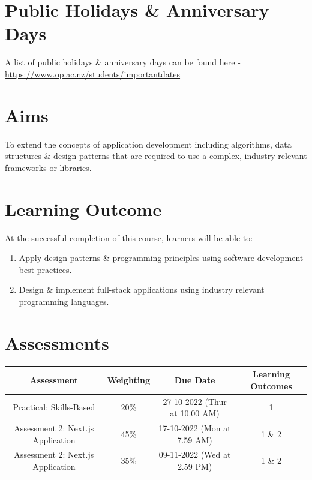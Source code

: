 \documentclass{article}
\begin{document}
\section*{Public Holidays \& Anniversary Days}
A list of public holidays \& anniversary days can be found here - \href{https://www.op.ac.nz/students/importantdates}{https://www.op.ac.nz/students/importantdates}

\section*{Aims}
To extend the concepts of application development including algorithms, data structures \& design patterns that are required to use a complex, industry-relevant frameworks or libraries.

\section*{Learning Outcome}
At the successful completion of this course, learners will be able to:
\begin{enumerate}
	\item Apply design patterns \& programming principles using software development best practices.
	\item Design \& implement full-stack applications using industry relevant programming languages.
\end{enumerate}

\section*{Assessments}
\renewcommand{\arraystretch}{1.5}
\begin{tabular}{|c|c|c|c|}
	\hline
	\textbf{Assessment}                                 & \textbf{Weighting} & \textbf{Due Date}            & \textbf{Learning Outcomes} \\ \hline
	\small Practical: Skills-Based & \small 20\%        & \small 27-10-2022 (Thur at 10.00 AM)   & \small 1                   \\ \hline
	\small Assessment 2: Next.js Application              & \small 45\%        & \small 17-10-2022 (Mon at 7.59 AM)  & \small 1 \& 2                   \\ \hline
	\small Assessment 2: Next.js Application                       & \small 35\%        & \small 09-11-2022 (Wed at 2.59 PM)  & \small 1 \& 2                   \\ \hline
\end{tabular}
\end{document}
